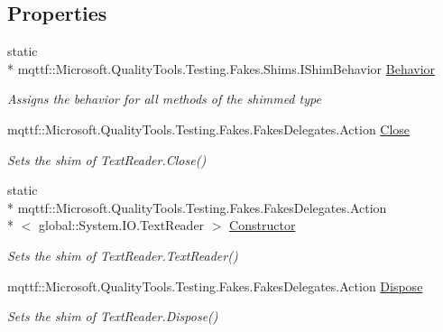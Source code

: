 \subsection*{Properties}
\begin{DoxyCompactItemize}
\item 
static \\*
mqttf\-::\-Microsoft.\-Quality\-Tools.\-Testing.\-Fakes.\-Shims.\-I\-Shim\-Behavior \hyperlink{class_system_1_1_i_o_1_1_fakes_1_1_shim_text_reader_a07713033a1b368a4ad9cc73caee1e2ab}{Behavior}
\begin{DoxyCompactList}\small\item\em Assigns the behavior for all methods of the shimmed type\end{DoxyCompactList}\item 
mqttf\-::\-Microsoft.\-Quality\-Tools.\-Testing.\-Fakes.\-Fakes\-Delegates.\-Action \hyperlink{class_system_1_1_i_o_1_1_fakes_1_1_shim_text_reader_acd749ea7cd7144e08ac5ba4218173d38}{Close}
\begin{DoxyCompactList}\small\item\em Sets the shim of Text\-Reader.\-Close()\end{DoxyCompactList}\item 
static \\*
mqttf\-::\-Microsoft.\-Quality\-Tools.\-Testing.\-Fakes.\-Fakes\-Delegates.\-Action\\*
$<$ global\-::\-System.\-I\-O.\-Text\-Reader $>$ \hyperlink{class_system_1_1_i_o_1_1_fakes_1_1_shim_text_reader_a89c4d79eb1dcfe91f73276d137d9e68d}{Constructor}
\begin{DoxyCompactList}\small\item\em Sets the shim of Text\-Reader.\-Text\-Reader()\end{DoxyCompactList}\item 
mqttf\-::\-Microsoft.\-Quality\-Tools.\-Testing.\-Fakes.\-Fakes\-Delegates.\-Action \hyperlink{class_system_1_1_i_o_1_1_fakes_1_1_shim_text_reader_ada6a130756159fc9f4e7c2239f70b67f}{Dispose}
\begin{DoxyCompactList}\small\item\em Sets the shim of Text\-Reader.\-Dispose()\end{DoxyCompactList}\item 

\end{DoxyCompactItemize}
